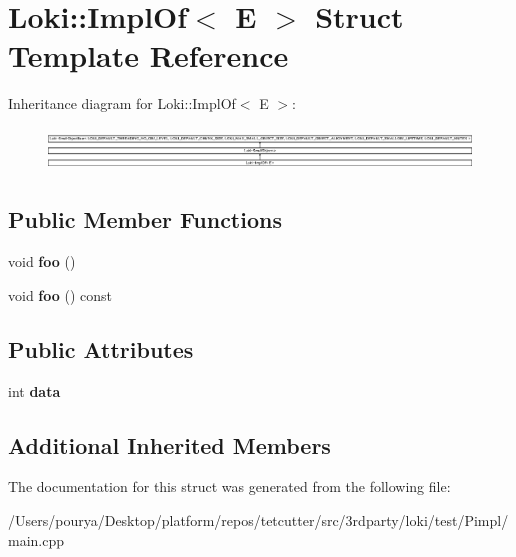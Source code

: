 \hypertarget{structLoki_1_1ImplOf_3_01E_01_4}{}\section{Loki\+:\+:Impl\+Of$<$ E $>$ Struct Template Reference}
\label{structLoki_1_1ImplOf_3_01E_01_4}
Inheritance diagram for Loki\+:\+:Impl\+Of$<$ E $>$\+:\begin{figure}[H]
\begin{center}
\leavevmode
\includegraphics[height=1.150685cm]{structLoki_1_1ImplOf_3_01E_01_4}
\end{center}
\end{figure}
\subsection*{Public Member Functions}
\begin{DoxyCompactItemize}
\item 
\hypertarget{structLoki_1_1ImplOf_3_01E_01_4_a5d7e0c282070306af6f74d8127e99377}{}void {\bfseries foo} ()\label{structLoki_1_1ImplOf_3_01E_01_4_a5d7e0c282070306af6f74d8127e99377}

\item 
\hypertarget{structLoki_1_1ImplOf_3_01E_01_4_a43721596f93927f9242c71c7c84fd792}{}void {\bfseries foo} () const \label{structLoki_1_1ImplOf_3_01E_01_4_a43721596f93927f9242c71c7c84fd792}

\end{DoxyCompactItemize}
\subsection*{Public Attributes}
\begin{DoxyCompactItemize}
\item 
\hypertarget{structLoki_1_1ImplOf_3_01E_01_4_adbaefae8565712984ae09f80da7081fe}{}int {\bfseries data}\label{structLoki_1_1ImplOf_3_01E_01_4_adbaefae8565712984ae09f80da7081fe}

\end{DoxyCompactItemize}
\subsection*{Additional Inherited Members}


The documentation for this struct was generated from the following file\+:\begin{DoxyCompactItemize}
\item 
/\+Users/pourya/\+Desktop/platform/repos/tetcutter/src/3rdparty/loki/test/\+Pimpl/main.\+cpp\end{DoxyCompactItemize}
